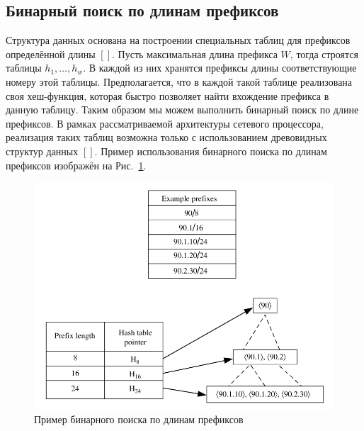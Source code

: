 \documentclass[a4paper, 12pt, titlepage, finall]{extreport}
\begin{document}
        \subsection{Бинарный поиск по длинам префиксов}
            Структура данных основана на построении специальных таблиц для префиксов определённой длины $[ ]$. Пусть максимальная длина префикса {\ttfamily $W$}, 
            тогда строятся таблицы {\ttfamily $h_{1},\ldots,h_{w}$}. В каждой из них хранятся префиксы длины соответствующие номеру этой таблицы. Предполагается, 
            что в каждой такой таблице реализована своя хеш-функция, которая быстро позволяет найти вхождение префикса в данную таблицу.
            Таким образом мы можем выполнить бинарный поиск по длине префиксов. В рамках рассматриваемой архитектуры сетевого процессора, реализация таких таблиц возможна только
            с использованием древовидных структур данных $[ ]$. Пример использования бинарного поиска по длинам префиксов изображён на Рис.~\ref{fig:mesh4}.

            \begin{figure}[h]
                \centering
                \includegraphics[width=\textwidth]{binary_search.png}
                \caption{Пример бинарного поиска по длинам префиксов}\label{fig:mesh4}
            \end{figure}
\end{document}
